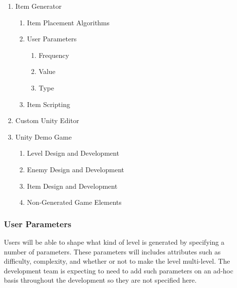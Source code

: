 \documentclass[pdftex,12pt,letter]{article}
\begin{document}
\begin{enumerate}
\item{Item Generator}
\begin{enumerate}
\item Item Placement Algorithms
\item User Parameters
\begin{enumerate}
\item Frequency
\item Value
\item Type
\end{enumerate}
\item Item Scripting
\end{enumerate}

\item{Custom Unity Editor}

\item{Unity Demo Game}
\begin{enumerate}
\item Level Design and Development
\item Enemy Design and Development
\item Item Design and Development
\item Non-Generated Game Elements
\end{enumerate}
\end{enumerate}

\subsubsection{User Parameters}
Users will be able to shape what kind of level is generated by specifying a number of parameters. These parameters will includes attributes such as difficulty, complexity, and whether or not to make the level multi-level. The development team is expecting to need to add such parameters on an ad-hoc basis throughout the development so they are not specified here.
\end{document}
